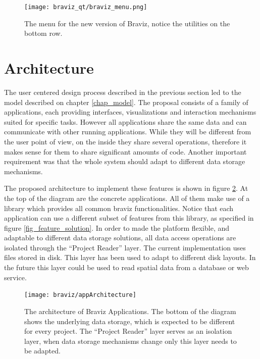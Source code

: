 \begin{figure}
\centering
\texttt{[image: braviz\_qt/braviz\_menu.png]}
\caption{\label{fig_menu_2}The menu for the new version of Braviz, notice the utilities on the bottom row.}
\end{figure}



\section{Architecture}
\label{sec_arch}

%


The user centered design process described in the previous section led to the model described on chapter \ref{chap_model}. The proposal consists of a family of applications, each providing interfaces, visualizations and interaction mechanisms suited for specific tasks. However all applications share the same data and can communicate with other running applications. While they will be different from the user point of view, on the inside they share several operations, therefore it makes sense for them to share significant amounts of code. Another important requirement was that the whole system should adapt to different data storage mechanisms.

The proposed architecture to implement these features is shown in figure \ref{fig_archi}. At the top of the diagram are the concrete applications. All of them make use of a library which provides all common braviz functionalities. Notice that each application can use a different subset of features from this library, as specified in figure \ref{fig_feature_solution}. In order to made the platform flexible, and adaptable to different data storage solutions, all data access operations are isolated through the "`Project Reader"' layer. The current implementation uses files stored in disk. This layer has been used to adapt to different disk layouts. In the future this layer could be used to read spatial data from a database or web service.

\begin{figure}
\texttt{[image: braviz/appArchitecture]}%
\caption{\label{fig_archi} The architecture of Braviz Applications. The bottom of the diagram shows the underlying data storage, which is expected to be different for every project. The "`Project Reader"' layer serves as an isolation layer, when data storage mechanisms change only this layer needs to be adapted.}
\end{figure}

